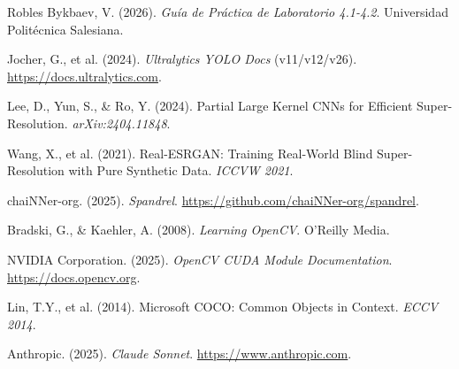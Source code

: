 \documentclass[12pt,a4paper]{article}
\begin{document}
\begin{enumerate}[label={[\arabic*]}]
  \item Robles Bykbaev, V. (2026). \textit{Guía de Práctica de Laboratorio 4.1-4.2}. Universidad Politécnica Salesiana.
  \item Jocher, G., et al. (2024). \textit{Ultralytics YOLO Docs} (v11/v12/v26). \url{https://docs.ultralytics.com}.
  \item Lee, D., Yun, S., \& Ro, Y. (2024). Partial Large Kernel CNNs for Efficient Super-Resolution. \textit{arXiv:2404.11848}.
  \item Wang, X., et al. (2021). Real-ESRGAN: Training Real-World Blind Super-Resolution with Pure Synthetic Data. \textit{ICCVW 2021}.
  \item chaiNNer-org. (2025). \textit{Spandrel}. \url{https://github.com/chaiNNer-org/spandrel}.
  \item Bradski, G., \& Kaehler, A. (2008). \textit{Learning OpenCV}. O'Reilly Media.
  \item NVIDIA Corporation. (2025). \textit{OpenCV CUDA Module Documentation}. \url{https://docs.opencv.org}.
  \item Lin, T.Y., et al. (2014). Microsoft COCO: Common Objects in Context. \textit{ECCV 2014}.
  \item Anthropic. (2025). \textit{Claude Sonnet}. \url{https://www.anthropic.com}.
\end{enumerate}
\end{document}
